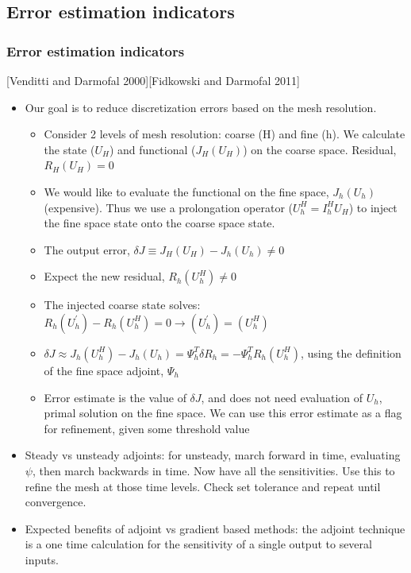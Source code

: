 \documentclass{beamer}
\begin{document}
\subsection[Estimation]{Error estimation indicators}
\begin{frame}
\scriptsize
\frametitle{Error estimation indicators}
[Venditti and Darmofal 2000][Fidkowski and Darmofal 2011]

\begin{itemize}
\item Our goal is to reduce discretization errors based on the mesh resolution.

\begin{itemize}
\tiny
\item Consider 2 levels of mesh resolution: coarse (H) and fine (h). We calculate the state ($U_H$) and functional ($J_H(U_H)$) on the coarse space. Residual, $R_H(U_H) = 0$
\item We would like to evaluate the functional on the fine space, $J_h(U_h)$ (expensive). Thus we use a prolongation operator ($U_h^H = I_h^H U_H$) to inject the fine space state onto the coarse space state.
\item The output error, $\delta J \equiv J_H(U_H) - J_h(U_h) \neq 0$
\item Expect the new residual, $R_h(U_h^H) \neq 0$ 
\item The injected coarse state solves: $ R_h(U_h^\prime) - R_h(U_h^H) = 0 \rightarrow (U_h^\prime) = (U_h^H)$
\item $ \delta J \approx  J_h(U_h^H) - J_h(U_h) = \Psi_h^T \delta R_h = -\Psi_h^T R_h(U_h^H)   $, using the definition of the fine space adjoint, $\Psi_h$
\item Error estimate is the value of $\delta J$, and does not need evaluation of $U_h$, primal solution on the fine space. We can use this error estimate as a flag for refinement, given some threshold value
\end{itemize}

\item Steady vs unsteady adjoints: for unsteady, march forward in time, evaluating $\psi$, then march backwards in time. Now have all the sensitivities. Use this to refine the mesh at those time levels. Check set tolerance and repeat until convergence.
\item Expected benefits of adjoint vs gradient based methods: the adjoint technique is a one time calculation for the sensitivity of a single output to several inputs.
\end{itemize}

\end{frame}
\end{document}
